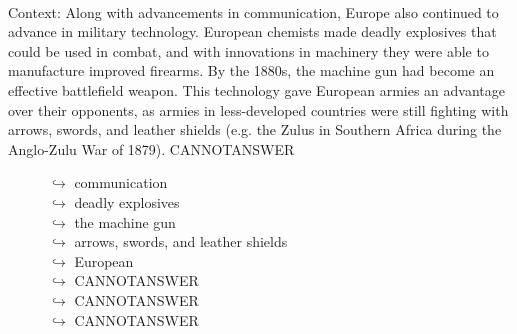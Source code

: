 \documentclass[11pt,a4paper, onecolumn]{article}
\begin{document}
\\ Context: Along with advancements in communication, Europe also continued to advance in military technology. European chemists made deadly explosives that could be used in combat, and with innovations in machinery they were able to manufacture improved firearms. By the 1880s, the machine gun had become an effective battlefield weapon. This technology gave European armies an advantage over their opponents, as armies in less-developed countries were still fighting with arrows, swords, and leather shields (e.g. the Zulus in Southern Africa during the Anglo-Zulu War of 1879). CANNOTANSWER

\begin{figure}[t] \small \begin{tcolorbox}[boxsep=0pt,left=5pt,right=0pt,top=2pt,colback = yellow!5] \begin{dialogue}
 \small 
\colorbox{pink!25}{$\hookrightarrow$}
{ communication }
\\
\colorbox{pink!25}{$\hookrightarrow$}
{ deadly explosives }
\\
\colorbox{pink!25}{$\hookrightarrow$}
{ the machine gun }
\\
\colorbox{pink!25}{$\hookrightarrow$}
{ arrows, swords, and leather shields }
\\
\colorbox{pink!25}{$\hookrightarrow$}
{ European }
\\
\colorbox{pink!25}{$\hookrightarrow$}
{ CANNOTANSWER }
\\
\colorbox{pink!25}{$\hookrightarrow$}
{ CANNOTANSWER }
\\
\colorbox{pink!25}{$\hookrightarrow$}
{ CANNOTANSWER }

\end{dialogue}
\end{tcolorbox}
\end{figure}
\end{document}
